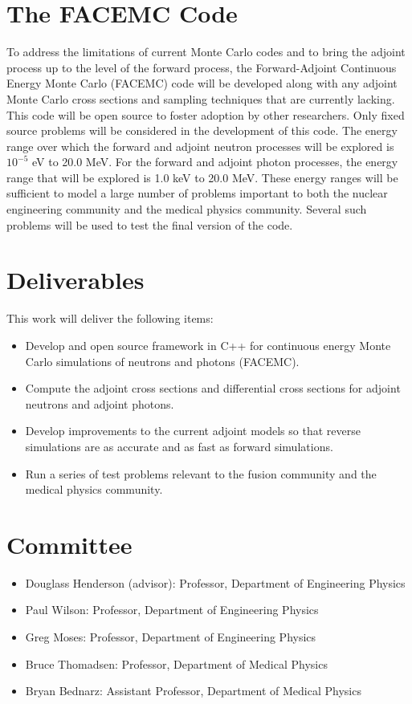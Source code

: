 \documentclass[letterpaper,12pt]{article}
\begin{document}
\section{The FACEMC Code}
\label{sec:research_outline}
To address the limitations of current Monte Carlo codes and to bring the adjoint
process up to the level of the forward process, the Forward-Adjoint Continuous 
Energy Monte Carlo (FACEMC) code will be developed along with any adjoint
Monte Carlo cross sections and sampling techniques that are currently lacking. 
This code will be open source to foster adoption by other researchers. Only 
fixed source problems will be considered in the development of this code. The 
energy range over which the forward and adjoint neutron processes 
will be explored is $10^{-5}$ eV to 20.0 MeV. For the forward and adjoint photon
processes, the energy range that will be explored is 1.0 keV to 
20.0 MeV. These energy ranges will be sufficient to model a large number of 
problems important to both the nuclear engineering community and the medical 
physics community. Several such problems will be used to test the final version 
of the code. 

\section{Deliverables}
This work will deliver the following items:
\begin{itemize}
  \item Develop and open source framework in C++ for continuous energy Monte 
    Carlo simulations of neutrons and photons (FACEMC).
  \item Compute the adjoint cross sections and differential cross sections
    for adjoint neutrons and adjoint photons.
  \item Develop improvements to the current adjoint models so that reverse 
    simulations are as accurate and as fast as forward simulations.
  \item Run a series of test problems relevant to the fusion community and the
    medical physics community.
\end{itemize}

\section{Committee}
\begin{itemize}
  \item Douglass Henderson (advisor): Professor, Department of Engineering Physics
  \item Paul Wilson: Professor, Department of Engineering Physics
  \item Greg Moses: Professor, Department of Engineering Physics
  \item Bruce Thomadsen: Professor, Department of Medical Physics
  \item Bryan Bednarz: Assistant Professor, Department of Medical Physics
\end{itemize}

\pagebreak


\end{document}
